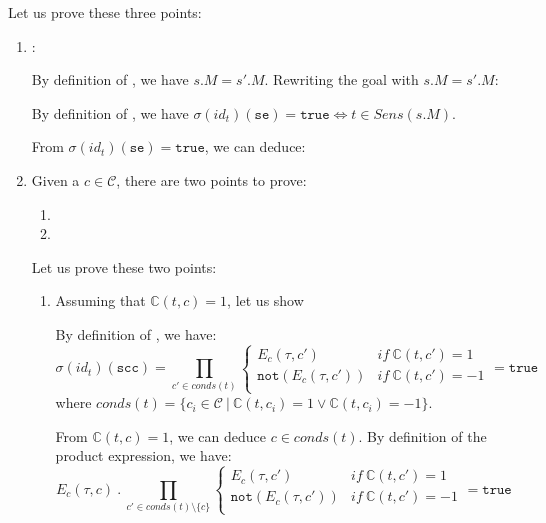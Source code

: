 \documentclass[dvipsnames,12pt]{article}
\begin{document}
\begin{niproof}
  Let us prove these three points:
  \begin{enumerate}
  \item {}:

    By definition of \dwSitpn, we have $s.M=s'.M$. Rewriting the goal
    with $s.M=s'.M$: 

    By definition of \upSim, we have
    $\sigma(id_t)(\texttt{se})=\mathtt{true}\Leftrightarrow{}t\in{}Sens(s.M)$.

    From $\sigma(id_t)(\texttt{se})=\mathtt{true}$, we can deduce: 
    
  \item

    Given a $c\in\mathcal{C}$, there are two points to prove:
    \begin{enumerate}
    \item
    \item
    \end{enumerate}

    Let us prove these two points:
    \begin{enumerate}
    \item Assuming that $\mathbb{C}(t,c)=1$, let us show

      By definition of \upSim, we have:
      \begin{equation}
        \sigma(id_t)(\texttt{scc})=\prod\limits_{c'\in{}conds(t)}
        \begin{cases}
          E_c(\tau,c') & if~\mathbb{C}(t,c')=1 \\
          \mathtt{not}(E_c(\tau,c')) & if~\mathbb{C}(t,c')=-1 \\
        \end{cases}=\mathtt{true}
        \label{eq:fe-eq-scc-prod-true}
      \end{equation}
      where
      $conds(t)=\{c_i\in\mathcal{C}~\vert~\mathbb{C}(t,c_i)=1\lor\mathbb{C}(t,c_i)=-1\}$.

      From $\mathbb{C}(t,c)=1$, we can deduce $c\in{}conds(t)$. By
      definition of the product expression, we have:
      \begin{equation}
        \label{eq:fe-eq-scc-prod-true-decomp}
        E_c(\tau,c)~.~\prod\limits_{c'\in{}conds(t)\setminus\{c\}}
        \begin{cases}
          E_c(\tau,c') & if~\mathbb{C}(t,c')=1 \\
          \mathtt{not}(E_c(\tau,c')) & if~\mathbb{C}(t,c')=-1 \\
        \end{cases}=\mathtt{true}
      \end{equation}


\end{enumerate}
\end{enumerate}
\end{niproof}
\end{document}
